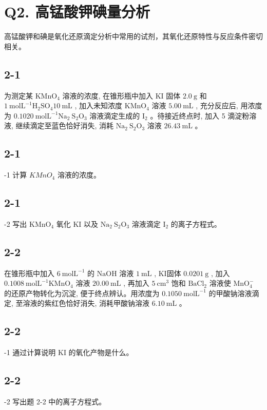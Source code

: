 \section*{Q2. 高锰酸钾碘量分析}
高锰酸钾和碘是氧化还原滴定分析中常用的试剂，其氧化还原特性与反应条件密切相关。

\subsection*{2-1}
为测定某 $\mathrm{KMnO}_{4}$ 溶液的浓度, 在锥形瓶中加入 KI 固体 $2.0 \mathrm{~g}$ 和 $1 \mathrm{~mol} \mathrm{L}^{- 1} \mathrm{H}_{2} \mathrm{SO}_{4} 10 \mathrm{~mL}$ , 加入未知浓度 $\mathrm{KMnO}_{4}$ 溶液 $5.00 \mathrm{~mL}$ , 充分反应后, 用浓度为 $0.1020 \mathrm{~mol} \mathrm{L}^{- 1} \mathrm{Na}_{2} \mathrm{~S}_{2} \mathrm{O}_{3}$ 溶液滴定生成的 $\mathrm{I}_{2}$ 。待接近终点时, 加入 5 滴淀粉溶液, 继续滴定至蓝色恰好消失, 消耗 $\mathrm{Na}_{2} \mathrm{~S}_{2} \mathrm{O}_{3}$ 溶液 $26.43 \mathrm{~mL}$ 。

\subsection*{2-1}
-1 计算 $KMnO_{4}$ 溶液的浓度。

\subsection*{2-1}
-2 写出 $\mathrm{KMnO}_{4}$ 氧化 KI 以及 $\mathrm{Na}_{2} \mathrm{~S}_{2} \mathrm{O}_{3}$ 溶液滴定 $\mathrm{I}_{2}$ 的离子方程式。

\subsection*{2-2}
在锥形瓶中加入 $6 \mathrm{~mol} \mathrm{L}^{-1}$ 的 $\mathrm{NaOH}$ 溶液 $1 \mathrm{~mL}$ , KI固体 $0.0201 \mathrm{~g}$ , 加入 $0.1008 \mathrm{~mol} \mathrm{L}^{-1} \mathrm{KMnO}_{4}$ 溶液 $20.00 \mathrm{~mL}$ , 再加入 $5 \mathrm{~cm}^{3}$ 饱和 $\mathrm{BaCl}_{2}$ 溶液使 $\mathrm{MnO}_{4}^{-}$ 的还原产物转化为沉淀, 便于终点辨认。用浓度为 $0.1050 \mathrm{~mol} \mathrm{L}^{-1}$ 的甲酸钠溶液滴定, 至溶液的紫红色恰好消失, 消耗甲酸钠溶液 $6.10 \mathrm{~mL}$ 。

\subsection*{2-2}
-1 通过计算说明 KI 的氧化产物是什么。

\subsection*{2-2}
-2 写出题 2-2 中的离子方程式。
